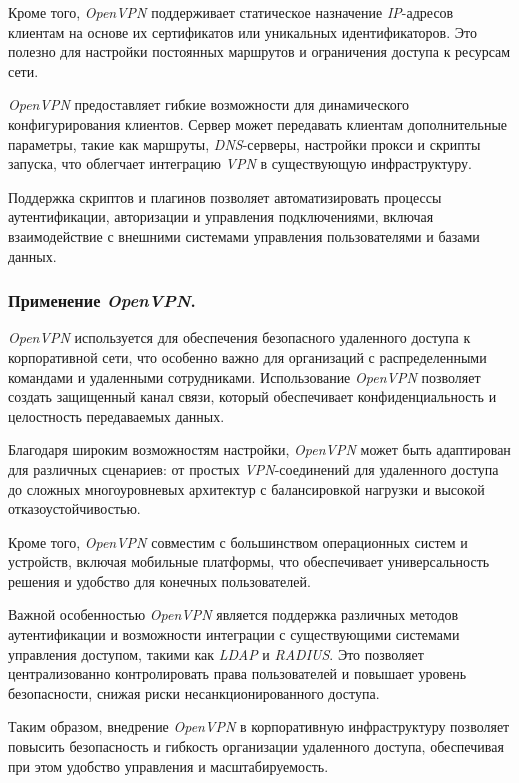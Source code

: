 Кроме того, \textit{OpenVPN} поддерживает статическое назначение \textit{IP}-адресов клиентам на основе их сертификатов или уникальных идентификаторов. Это полезно для настройки постоянных маршрутов и ограничения доступа к ресурсам сети.

\textit{OpenVPN} предоставляет гибкие возможности для динамического конфигурирования клиентов. Сервер может передавать клиентам дополнительные параметры, такие как маршруты, \textit{DNS}-серверы, настройки прокси и скрипты запуска, что облегчает интеграцию \textit{VPN} в существующую инфраструктуру.

Поддержка скриптов и плагинов позволяет автоматизировать процессы аутентификации, авторизации и управления подключениями, включая взаимодействие с внешними системами управления пользователями и базами данных.

\subsubsection{Применение \textit{OpenVPN}.}
\textit{OpenVPN} используется для обеспечения безопасного удаленного доступа к корпоративной сети, что особенно важно для организаций с распределенными командами и удаленными сотрудниками. Использование \textit{OpenVPN} позволяет создать защищенный канал связи, который обеспечивает конфиденциальность и целостность передаваемых данных.

Благодаря широким возможностям настройки, \textit{OpenVPN} может быть адаптирован для различных сценариев: от простых \textit{VPN}-соединений для удаленного доступа до сложных многоуровневых архитектур с балансировкой нагрузки и высокой отказоустойчивостью.

Кроме того, \textit{OpenVPN} совместим с большинством операционных систем и устройств, включая мобильные платформы, что обеспечивает универсальность решения и удобство для конечных пользователей.

Важной особенностью \textit{OpenVPN} является поддержка различных методов аутентификации и возможности интеграции с существующими системами управления доступом, такими как \textit{LDAP} и \textit{RADIUS}. Это позволяет централизованно контролировать права пользователей и повышает уровень безопасности, снижая риски несанкционированного доступа.

Таким образом, внедрение \textit{OpenVPN} в корпоративную инфраструктуру позволяет повысить безопасность и гибкость организации удаленного доступа, обеспечивая при этом удобство управления и масштабируемость.

